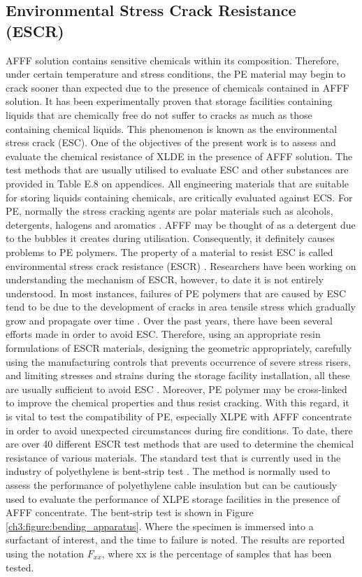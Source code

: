 \documentclass[12pt]{report}
\begin{document}
\subsection{Environmental Stress Crack Resistance (ESCR)}
AFFF solution contains sensitive chemicals within its composition. Therefore, under certain temperature and stress conditions, the PE material may begin to crack sooner than expected due to the presence of chemicals contained in AFFF solution. It has been experimentally proven that storage facilities containing liquids that are chemically free do not suffer to cracks as much as those containing chemical liquids. This phenomenon is known as the environmental stress crack (ESC). One of the objectives of the present work is to assess and evaluate the chemical resistance of XLDE in the presence of AFFF solution. The test methods that are usually utilised to evaluate ESC and other substances are provided in Table E.8 on appendices. 
All engineering materials that are suitable for storing liquids containing chemicals, are critically evaluated against ECS. For PE, normally the stress cracking agents are polar materials such as alcohols, detergents, halogens and aromatics \cite{gabriel1998history}. AFFF may be thought of as a detergent due to the bubbles it creates during utilisation. Consequently, it definitely causes problems to PE polymers. The property of a material to resist ESC is called environmental stress crack resistance (ESCR) \cite{gabriel1998history}. Researchers have been working on understanding the mechanism of ESCR, however, to date it is not entirely understood. In most instances, failures of PE polymers that are caused by ESC tend to be due to the development of cracks in area tensile stress which gradually grow and propagate over time \cite{meola2005cross}. 
Over the past years, there have been several efforts made in order to avoid ESC. Therefore, using an appropriate resin formulations of ESCR materials, designing the geometric appropriately, carefully using the manufacturing controls that prevents occurrence of severe stress risers, and limiting stresses and strains during the storage facility installation, all these are usually sufficient to avoid ESC \cite{gabriel1998history}. Moreover, PE polymer may be cross-linked to improve the chemical properties and thus resist cracking.  With this regard, it is vital to test the compatibility of PE, especially XLPE with AFFF concentrate in order to avoid unexpected circumstances during fire conditions. To date, there are over 40 different ESCR test methods that are used to determine the chemical resistance of various materials. The standard test that is currently used in the industry of polyethylene is bent-strip test \cite{gabriel1998history}. The method is normally used to assess the performance of polyethylene cable insulation but can be cautiously used to evaluate the performance of XLPE storage facilities in the presence of AFFF concentrate. The bent-strip test is shown in Figure \ref{ch3:figure:bending_apparatus}. Where the specimen is immersed into a surfactant of interest, and the time to failure is noted. The results are reported using the notation $F_{xx}$, where xx is the percentage of samples that has been tested.
 
\end{document}
